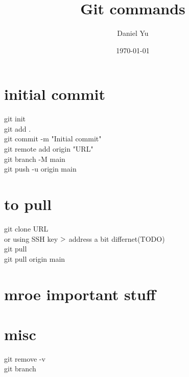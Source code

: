 \documentclass[11pt]{article}
\title{Git commands}
\author{Daniel Yu}
\date{\today}
\begin{document}

\maketitle

\section{initial commit}
git init\\
git add .\\
git commit -m "Initial commit"\\
git remote add origin "URL"\\
git branch -M main\\
git push -u origin main\\

\section{to pull}
git clone URL\\
or using SSH key $\->$ address a bit differnet(TODO)\\
git pull\\
git pull origin main\\

\section{mroe important stuff}

\section{misc}
git remove -v\\
git branch\\
\end{document}
